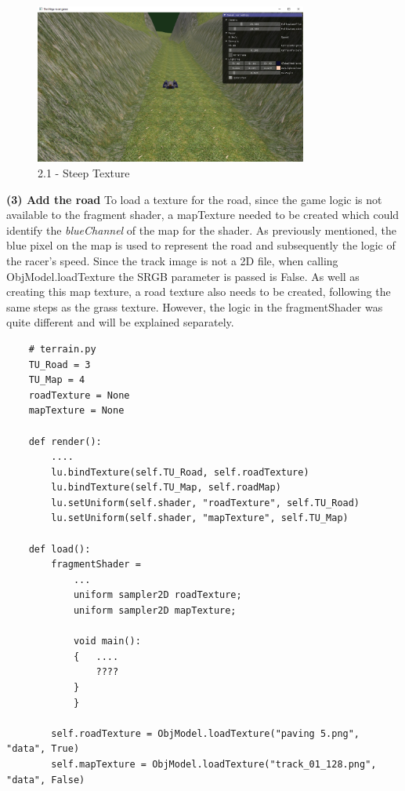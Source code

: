 \documentclass[a4 paper, 12pt]{article}
\begin{document}
    \begin{figure} [H]
        \centering
        \includegraphics[width=0.8\textwidth, frame]
            {./images/mega_racer/2.1_b.PNG}
        \caption{2.1 - Steep Texture}   
    \end{figure}


\textbf{(3) Add the road}
To load a texture for the road, since the game logic is not available to the fragment shader, a mapTexture needed to be created which could identify the \textit{blueChannel} of the map for the shader. As previously mentioned, the blue pixel on the map is used to represent the road and subsequently the logic of the racer's speed. Since the track image is not a 2D file, when calling ObjModel.loadTexture the SRGB parameter is passed is False. As well as creating this map texture, a road texture also needs to be created, following the same steps as the grass texture. However, the logic in the fragmentShader was quite different and will be explained separately.

\begin{lstlisting}
    # terrain.py
    TU_Road = 3
    TU_Map = 4
    roadTexture = None
    mapTexture = None

    def render():
        ....
        lu.bindTexture(self.TU_Road, self.roadTexture)
        lu.bindTexture(self.TU_Map, self.roadMap)
        lu.setUniform(self.shader, "roadTexture", self.TU_Road)
        lu.setUniform(self.shader, "mapTexture", self.TU_Map)

    def load():
        fragmentShader = 
            ...
            uniform sampler2D roadTexture;
            uniform sampler2D mapTexture;

            void main():
            {   ....
                ????
            }
            }
        
        self.roadTexture = ObjModel.loadTexture("paving 5.png", "data", True)
        self.mapTexture = ObjModel.loadTexture("track_01_128.png", "data", False)
\end{lstlisting}
\end{document}
